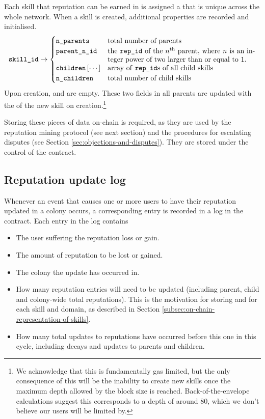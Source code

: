 Each skill that reputation can be earned in is assigned a  that is unique across the whole network. When a skill is created, additional properties are recorded and initialised.
\begin{equation*}
  \ascode{skill\_id} \rightarrow 
  \begin{cases}
    \ascode{n\_parents} &	\textnormal{total number of parents}\\
    \ascode{parent\_n\_id} &	\parbox[t]{.6\linewidth}{\textnormal{the \ascode{rep\_id} of the $n^{\rm th}$ parent, where $n$ is an integer power of two larger than or equal to 1. }}\\
    \ascode{children}\left[\cdots\right] &	\textnormal{array of \ascode{rep\_id}s of all child skills}\\
    \ascode{n\_children} &	\textnormal{total number of child skills}
  \end{cases}
\end{equation*}
Upon creation,  and  are empty\watermark. These two fields in all parents are updated with the  of the new skill on creation.\footnote{We acknowledge that this is fundamentally gas limited, but the only consequence of this will be the inability to create new skills once the maximum depth allowed by the block size is reached. Back-of-the-envelope calculations suggest this corresponds to a depth of around 80, which we don't believe our users will be limited by.}

Storing these pieces of data on-chain is required, as they are used by the reputation mining protocol (see next section) and the procedures for escalating disputes (see Section \ref{sec:objections-and-disputes}). They are stored under the control of the  contract.

\subsection{Reputation update log}\label{subsec:reputation-update-log}

Whenever an event that causes one or more users to have their reputation updated in a colony occurs, a corresponding entry is recorded in a log in the  contract. Each entry in the log contains

\begin{itemize}
\item The user suffering the reputation loss or gain.
\item The amount of reputation to be lost or gained.
\item The colony the update has occurred in.
\item How many reputation entries will need to be updated (including parent, child and colony-wide total reputations). This is the motivation for storing  and  for each skill and domain, as described in Section \ref{subsec:on-chain-representation-of-skills}.
\item How many total updates to reputations have occurred before this one in this cycle, including decays and updates to parents and children.
\end{itemize}

